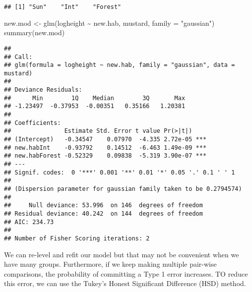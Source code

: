 \documentclass[
]{article}
\newenvironment{Shaded}{\begin{snugshade}}{\end{snugshade}}
\newcommand{\AttributeTok}[1]{\textcolor[rgb]{0.77,0.63,0.00}{#1}}
\newcommand{\CommentTok}[1]{\textcolor[rgb]{0.56,0.35,0.01}{\textit{#1}}}
\newcommand{\FunctionTok}[1]{\textcolor[rgb]{0.00,0.00,0.00}{#1}}
\newcommand{\NormalTok}[1]{#1}
\newcommand{\OtherTok}[1]{\textcolor[rgb]{0.56,0.35,0.01}{#1}}
\newcommand{\SpecialCharTok}[1]{\textcolor[rgb]{0.00,0.00,0.00}{#1}}
\newcommand{\StringTok}[1]{\textcolor[rgb]{0.31,0.60,0.02}{#1}}
\begin{document}
\begin{Shaded}
\end{Shaded}

\begin{verbatim}
## [1] "Sun"    "Int"    "Forest"
\end{verbatim}

\begin{Shaded}
\begin{Highlighting}[]
\NormalTok{new.mod }\OtherTok{\textless{}{-}} \FunctionTok{glm}\NormalTok{(logheight }\SpecialCharTok{\textasciitilde{}}\NormalTok{ new.hab, mustard, }\AttributeTok{family =} \StringTok{"gaussian"}\NormalTok{)}
\FunctionTok{summary}\NormalTok{(new.mod)}
\end{Highlighting}
\end{Shaded}

\begin{verbatim}
## 
## Call:
## glm(formula = logheight ~ new.hab, family = "gaussian", data = mustard)
## 
## Deviance Residuals: 
##      Min        1Q    Median        3Q       Max  
## -1.23497  -0.37953  -0.00351   0.35166   1.20381  
## 
## Coefficients:
##               Estimate Std. Error t value Pr(>|t|)    
## (Intercept)   -0.34547    0.07970  -4.335 2.72e-05 ***
## new.habInt    -0.93792    0.14512  -6.463 1.49e-09 ***
## new.habForest -0.52329    0.09838  -5.319 3.90e-07 ***
## ---
## Signif. codes:  0 '***' 0.001 '**' 0.01 '*' 0.05 '.' 0.1 ' ' 1
## 
## (Dispersion parameter for gaussian family taken to be 0.2794574)
## 
##     Null deviance: 53.996  on 146  degrees of freedom
## Residual deviance: 40.242  on 144  degrees of freedom
## AIC: 234.73
## 
## Number of Fisher Scoring iterations: 2
\end{verbatim}

We can re-level and refit our model but that may not be convenient when
we have many groups. Furthermore, if we keep making multiple pair-wise
comparisons, the probability of committing a Type 1 error increases. TO
reduce this error, we can use the Tukey's Honest Significant Difference
(HSD) method.
\end{document}
